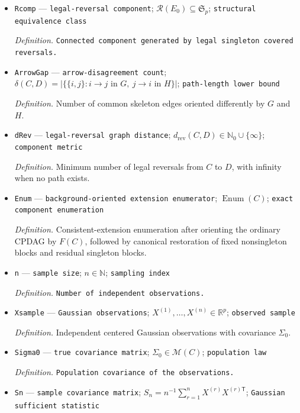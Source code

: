 \documentclass{article}
\begin{document}
\begin{itemize}
  \item \texttt{Rcomp} --- \texttt{legal-\allowbreak{}reversal component}; \(\mathcal R(E_0)\subseteq\mathfrak S_p\); \texttt{structural equivalence class}
  \par\smallskip\noindent\emph{Definition.} \texttt{Connected component generated by legal singleton covered reversals.}
  \item \texttt{ArrowGap} --- \texttt{arrow-\allowbreak{}disagreement count}; \(\delta(C,D)=|\{\{i,j\}:i\to j\text{ in }G,\ j\to i\text{ in }H\}|\); \texttt{path-\allowbreak{}length lower bound}
  \par\smallskip\noindent\emph{Definition.} Number of common skeleton edges oriented differently by \(G\) and \(H\).
  \item \texttt{dRev} --- \texttt{legal-\allowbreak{}reversal graph distance}; \(d_{\mathrm{rev}}(C,D)\in\mathbb N_0\cup\{\infty\}\); \texttt{component metric}
  \par\smallskip\noindent\emph{Definition.} Minimum number of legal reversals from \(C\) to \(D\), with infinity when no path exists.
  \item \texttt{Enum} --- \texttt{background-\allowbreak{}oriented extension enumerator}; \(\operatorname{Enum}(C)\); \texttt{exact component enumeration}
  \par\smallskip\noindent\emph{Definition.} Consistent-extension enumeration after orienting the ordinary CPDAG by \(F(C)\), followed by canonical restoration of fixed nonsingleton blocks and residual singleton blocks.
  \item \texttt{n} --- \texttt{sample size}; \(n\in\mathbb N\); \texttt{sampling index}
  \par\smallskip\noindent\emph{Definition.} \texttt{Number of independent observations.}
  \item \texttt{Xsample} --- \texttt{Gaussian observations}; \(X^{(1)},\ldots,X^{(n)}\in\mathbb R^p\); \texttt{observed sample}
  \par\smallskip\noindent\emph{Definition.} Independent centered Gaussian observations with covariance \(\Sigma_0\).
  \item \texttt{Sigma0} --- \texttt{true covariance matrix}; \(\Sigma_0\in\mathcal M(C)\); \texttt{population law}
  \par\smallskip\noindent\emph{Definition.} \texttt{Population covariance of the observations.}
  \item \texttt{Sn} --- \texttt{sample covariance matrix}; \(S_n=n^{-1}\sum_{r=1}^nX^{(r)}X^{(r)\mathsf T}\); \texttt{Gaussian sufficient statistic}

\end{itemize}
\end{document}
